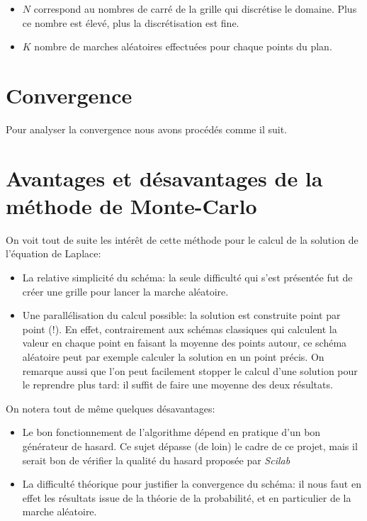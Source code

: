 \documentclass[11pt, a4paper]{article}
\begin{document}
\begin{itemize}
	\item $N$ correspond au nombres de carré de la grille qui discrétise le domaine. Plus ce nombre est
		élevé, plus la discrétisation est fine.
	\item $K$ nombre de marches aléatoires effectuées pour chaque points du plan.
\end{itemize}

\section{Convergence}

Pour analyser la convergence nous avons procédés comme il suit.

\section{Avantages et désavantages de la méthode de Monte-Carlo}

On voit tout de suite les intérêt de cette méthode pour le calcul de la solution de l'équation de
Laplace:
\begin{itemize}
	\item La relative simplicité du schéma: la seule difficulté qui s'est présentée fut de créer
		une grille pour lancer la marche aléatoire.
	\item Une parallélisation du calcul possible: la solution est construite point par point
		(!). En effet, contrairement aux schémas classiques qui calculent la valeur en
		chaque point en faisant la moyenne des points autour, ce schéma aléatoire peut par
		exemple calculer la solution en un point précis. On remarque aussi que l'on peut
		facilement stopper le calcul d'une solution pour le reprendre plus tard: il suffit
		de faire une moyenne des deux résultats.
\end{itemize}

On notera tout de même quelques désavantages:
\begin{itemize}
	\item Le bon fonctionnement de l'algorithme dépend en pratique d'un bon générateur de
		hasard. Ce sujet dépasse (de loin) le cadre de ce projet, mais il serait bon de
		vérifier la qualité du hasard proposée par \emph{Scilab}

	\item La difficulté théorique pour justifier la convergence du schéma: il nous faut en effet
		les résultats issue de la théorie de la probabilité, et en particulier de la marche
		aléatoire.
\end{itemize}
\end{document}
